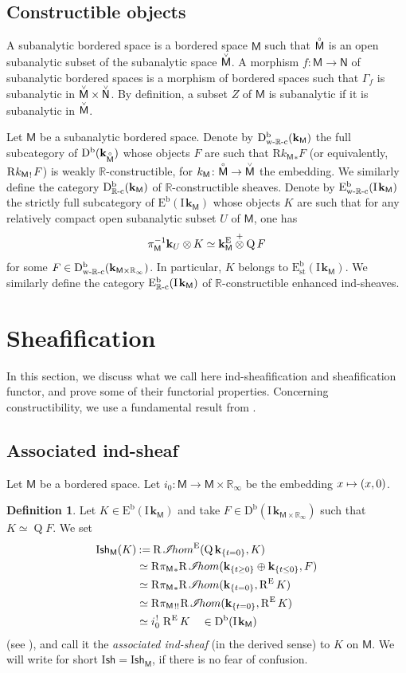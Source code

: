 \documentclass[JEP,XML,SOM,Unicode]{cedram}
\let\mathcal\mathscr
\newcommand\mto{\mathchoice{\longmapsto}{\mapsto}{\mapsto}{\mapsto}}
\theoremstyle{plain}
\theoremstyle{definition}
\newtheorem{definition}[theorem]{Definition}
\newcommand{\R}{\mathbb{R}}
\newcommand{\bR}{{\R_\infty}}
\DeclareMathOperator{\quot}{Q}
\newcommand{\derived}[1]{\mathrm{#1}}
\newcommand{\derd}{\derived{D}}
\newcommand{\dere}{\derived{E}}\let\enh\dere
\newcommand{\derr}{\derived{R}}
\newcommand{\BDC}{\derd^{\mathrm{b}}}
\newcommand{\BEC}[2][\ifield]{\dere^{\mathrm{b}}(#1_{#2})}
\newcommand{\BECs}[2][\ifield]{\dere^{\mathrm{b}}_\stab(#1_{#2})}
\newcommand{\BECRc}[2][\ifield]{\dere^{\mathrm{b}}_\Rc(#1_{#2})}
\newcommand{\BECwRc}[2][\ifield]{\dere^{\mathrm{b}}_\wRc(#1_{#2})}
\newcommand{\roim}[1]{\derr#1_*}
\newcommand{\reim}[1]{\derr#1_{\mspace{.5mu}!}\mspace{2mu}}
\newcommand{\reeim}[1]{\derr#1_{\mspace{1mu}!!}\mspace{1mu}}
\newcommand{\rihom}{{\derr\mspace{2mu}\shi\!hom}}
\newcommand{\fihom}{\rihom^\enh}
\newcommand{\epb}[1]{#1^{\mspace{1.5mu}!}\mspace{2mu}}
\newcommand{\sheaffont}[1]{\mathcal{#1}}
\newcommand\shi{\sheaffont{I}}
\newcommand{\RE}{\operatorname{R^\enh}}
\newcommand{\stab}{{\operatorname{st}}}
\newcommand{\Rc}{{\R\text-\mathrm{c}}}
\newcommand{\wRc}{{\mathrm{w}\text-\R\text-\mathrm{c}}}
\newcommand{\field}{\mathbf{k}}\let\cor\field
\newcommand{\ind}{\mathrm{I}\mspace{2mu}}
\newcommand{\ifield}{\ind\field}
\newcommand{\bclose}[1]{{\accentset{\vee}{#1}}}\let\cc\bclose
\newcommand{\unbordered}[1]{{\accentset{\circ}{#1}}}
\newcommand{\ctens}{\mathbin{\mathop\otimes\limits^+}}
\newcommand{\Ish}{\mathrm{I}\mathsf{sh}}
\newcommand{\bbM}{\mathsf{M}}
\newcommand{\obM}{\unbordered{\bbM}}
\newcommand{\cbM}{\bclose{\bbM}}
\newcommand{\bbN}{\mathsf{N}}
\newcommand{\cbN}{\bclose{\bbN}}
\newcommand{\inc}[1][\bbM]{k_{#1}}
\newcommand{\defeq}{\mathbin{:=}}\let \seteq\defeq
\newcommand{\tens}[1][]{\mathbin{\otimes_{\raise1.5ex\hbox to-.1em{}#1}}}
\newcommand{\st}[1]{{\{{#1}\}}}
\newcommand{\opb}[1]{#1^{-1}}
\begin{document}
\subsection{Constructible objects}
A subanalytic bordered space is a bordered space $\bbM$ such that $\obM$ is an open subanalytic subset of the subanalytic space $\cbM$. A morphism $f\colon\bbM\to\bbN$ of subanalytic bordered spaces is a morphism of bordered spaces such that $\Gamma_f$ is subanalytic in $\cbM\times\cbN$.
By definition, a subset $Z$ of $\bbM$ is subanalytic if it is subanalytic in $\cbM$.


Let $\bbM$ be a subanalytic bordered space. Denote by $\BDC_\wRc(\field_\bbM)$ the full subcategory of $\BDC(\field_\obM)$ whose objects $F$ are such that $\roim{{\inc}} F$ (or equivalently, $\reim{{\inc}} F$) is weakly $\R$-constructible, for $\inc\colon \obM\to\cbM$ the embedding.
We similarly define the category $\BDC_\Rc(\field_\bbM)$ of $\R$-constructible sheaves. Denote by
$\BECwRc\bbM$ the strictly full subcategory of $\BEC\bbM$ whose objects $K$
are such that for any relatively compact open subanalytic subset $U$ of $\bbM$,
one has
\[
\opb{\pi_\bbM}\field_U\tens K \simeq \field_\bbM^\enh \ctens \quot F
\]
for some $F\in \BDC_\wRc(\field_{\bbM\times\bR})$.
In particular, $K$ belongs to $\BECs\bbM$.
We similarly define the category $\BECRc\bbM$ of $\R$-constructible enhanced ind-sheaves.

\section{Sheafification}\label{se:sh}

In this section, we discuss what we call here ind-sheafification and sheafification functor, and prove some of their functorial properties. Concerning constructibility, we use a fundamental result from \cite[\S6]{KS16}.

\subsection{Associated ind-sheaf}

Let $\bbM$ be a bordered space.
Let $i_0\colon\bbM\to\bbM\times\bR$ be the embedding $x\mto(x,0)$.

\begin{definition}
Let $K\in\BEC \bbM$ and take
$F\in\BDC(\ifield_{\bbM\times\bR})$ such that $K\simeq\quot F$.
We set
\begin{align*}
\Ish_\bbM(K) &\defeq \fihom(\quot\field_{\st{t=0}},K) \\
&\simeq \roim{{\pi_\bbM}}\rihom(\field_{\st{t\ge0}}\oplus\field_{\st{t\le0}}, F) \\
&\simeq\roim{{\pi_\bbM}}\rihom(\field_{\st{t=0}}, \RE K) \\
&\simeq \reeim{{\pi_\bbM}}\rihom(\field_{\st{t=0}}, \RE K) \\
&\simeq \epb{i_0}\RE K \quad \in \BDC(\ifield_\bbM)
\end{align*}
(see \cite[Lem.\,4.5.16]{DK16}), and call it the \emph{associated ind-sheaf} (in the derived sense) to $K$ on $\bbM$.
We will write for short $\Ish=\Ish_\bbM$, if there is no fear of confusion.
\end{definition}
\end{document}
